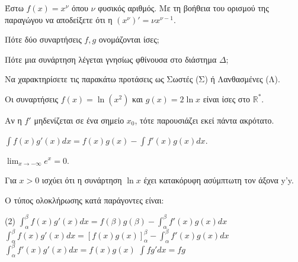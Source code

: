 \documentclass[11pt,a4paper]{article}
\newcommand{\kerkissans}[1]{{\fontfamily{maksf}\selectfont \textbf{#1}}}
\renewcommand{\textdexiakeraia}{}
\newcommand{\dint}{\displaystyle\int}
\newcommand\themanum{A}
\newcounter{thema}[section]
\renewcommand{\thethema}{\arabic{thema}}
\newcommand{\Thema}{\refstepcounter{thema}{\textbf{\textcolor{black}{\faPenSquare\ \  \large \kerkissans{\textbf{\thethemaο\hspace{2mm}Θέμα}}}}}\hspace{0mm}}{}
\newenvironment{thema}[1]
{\begin{tcolorbox}[title=\Thema\kerkissans{\textbf{\large{  #1}}},breakable,
enhanced standard,titlerule=0pt,toprule=0pt, rightrule=0pt, bottomrule=0pt,
colback=white,left=0mm,top=1mm,bottom=0mm,
boxrule=0pt,
colframe=white,leftrule=0mm,sharp corners,coltitle=black]
\renewcommand{\themanum}{#1}}
{\end{tcolorbox}}
\begin{document}
\begin{thema}{A}
\begin{erwthma}
    \item Έστω $f(x) = x^\nu$ όπου $\nu$ φυσικός αριθμός. Με τη βοήθεια του ορισμού της παραγώγου να αποδείξετε ότι η $(x^\nu)' = \nu x^{\nu - 1}$. 
    \item Πότε δύο συναρτήσεις $f, g$ ονομάζονται ίσες;
    \item Πότε μια συνάρτηση λέγεται γνησίως φθίνουσα στο διάστημα $\Delta$;
    \item Να χαρακτηρίσετε τις παρακάτω προτάσεις ως Σωστές (Σ) ή Λανθασμένες (Λ).
    \begin{alist}
        \item Οι συναρτήσεις $f(x) = \ln(x^2)$ και $g(x) = 2\ln x$ είναι ίσες στο $\mathbb{R}^*$.
        \item Αν η $f'$ μηδενίζεται σε ένα σημείο $x_0$, τότε παρουσιάζει εκεί πάντα ακρότατο.
        \item $\dint f(x)g'(x) dx = f(x)g(x) - \dint f'(x)g(x) dx$.
        \item $\lim_{x \to -\infty} e^x = 0$.
        \item Για $x > 0$ ισχύει ότι η συνάρτηση $\ln x$ έχει κατακόρυφη ασύμπτωτη τον άξονα y'y.
    \end{alist}
    \item Ο τύπος ολοκλήρωσης κατά παράγοντες είναι:
    \begin{tasks}[label=\let\textdexiakeraia\relax\alph*.](2)
        \task $\dint_\alpha^\beta f(x)g'(x) dx = f(\beta)g(\beta) - \dint_\alpha^\beta f'(x)g(x) dx$
        \task $\dint_\alpha^\beta f(x)g'(x) dx = [f(x)g(x)]_\alpha^\beta - \dint_\alpha^\beta f'(x)g(x) dx$
        \task $\dint_\alpha^\beta f'(x)g'(x) dx = f(x)g(x)$
        \task $\dint f g' dx = f g$
    \end{tasks}
\end{erwthma}
\end{thema}
\vspace{1cm}
\end{document}
